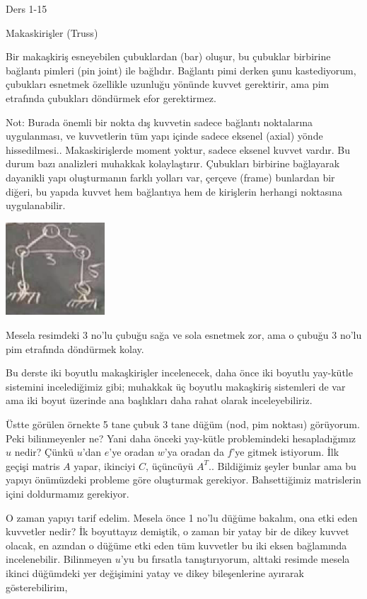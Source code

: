 \documentclass[12pt,fleqn]{article}\usepackage{../../common}
\begin{document}
Ders 1-15

Makaskirişler (Truss)

Bir makaşkiriş esneyebilen çubuklardan (bar) oluşur, bu çubuklar birbirine
bağlantı pimleri (pin joint) ile bağlıdır. Bağlantı pimi derken şunu
kastediyorum, çubukları esnetmek özellikle uzunluğu yönünde kuvvet gerektirir,
ama pim etrafında çubukları döndürmek efor gerektirmez.

Not: Burada önemli bir nokta dış kuvvetin sadece bağlantı noktalarına
uygulanması, ve kuvvetlerin tüm yapı içinde sadece eksenel (axial) yönde
hissedilmesi..  Makaskirişlerde moment yoktur, sadece eksenel kuvvet vardır. Bu
durum bazı analizleri muhakkak kolaylaştırır. Çubukları birbirine bağlayarak
dayanikli yapı oluşturmanın farklı yolları var, çerçeve (frame) bunlardan
bir diğeri, bu yapıda kuvvet hem bağlantıya hem de kirişlerin herhangi
noktasına uygulanabilir.

\includegraphics[width=10em]{compscieng_1_15_01.png}

Mesela resimdeki 3 no'lu çubuğu sağa ve sola esnetmek zor, ama o çubuğu
3 no'lu pim etrafında döndürmek kolay.

Bu derste iki boyutlu makaşkirişler incelenecek, daha önce iki boyutlu yay-kütle
sistemini incelediğimiz gibi; muhakkak üç boyutlu makaşkiriş sistemleri de var
ama iki boyut üzerinde ana başlıkları daha rahat olarak inceleyebiliriz.

Üstte görülen örnekte 5 tane çubuk 3 tane düğüm (nod, pim noktası) görüyorum.
Peki bilinmeyenler ne? Yani daha önceki yay-kütle problemindeki hesapladığımız
$u$ nedir? Çünkü $u$'dan $e$'ye oradan $w$'ya oradan da $f$'ye gitmek
istiyorum. İlk geçişi matris $A$ yapar, ikinciyi $C$, üçüncüyü $A^T$..
Bildiğimiz şeyler bunlar ama bu yapıyı önümüzdeki probleme göre oluşturmak
gerekiyor. Bahsettiğimiz matrislerin içini doldurmamız gerekiyor.

O zaman yapıyı tarif edelim. Mesela önce 1 no'lu düğüme bakalım, ona etki eden
kuvvetler nedir? İk boyuttayız demiştik, o zaman bir yatay bir de dikey kuvvet
olacak, en azından o düğüme etki eden tüm kuvvetler bu iki eksen bağlamında
incelenebilir. Bilinmeyen $u$'yu bu fırsatla tanıştırıyorum, alttaki resimde
mesela ikinci düğümdeki yer değişimini yatay ve dikey bileşenlerine ayırarak
gösterebilirim,
\end{document}
